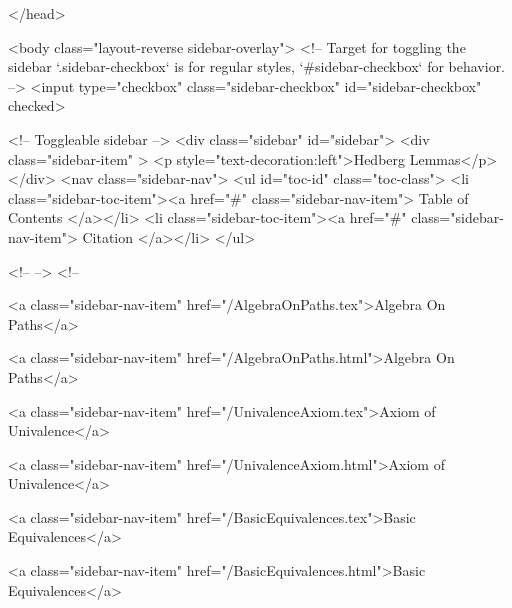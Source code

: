  
</head>




  <body class="layout-reverse sidebar-overlay">
    <!-- Target for toggling the sidebar `.sidebar-checkbox` is for regular
     styles, `#sidebar-checkbox` for behavior. -->
<input type="checkbox" class="sidebar-checkbox" id="sidebar-checkbox" checked>

<!-- Toggleable sidebar -->
<div class="sidebar" id="sidebar">
  <div class="sidebar-item" >
    <p style="text-decoration:left">Hedberg Lemmas</p>
  </div>
  <nav class="sidebar-nav">
    <ul id="toc-id" class="toc-class">
  <li class="sidebar-toc-item"><a href="#" class="sidebar-nav-item"> Table of Contents </a></li>
  <li class="sidebar-toc-item"><a href="#" class="sidebar-nav-item"> Citation </a></li>
</ul>


    <!--  -->
    <!-- 
      
    
      
    
      
    
      
    
      
        
      
    
      
        
          <a class="sidebar-nav-item" href="/AlgebraOnPaths.tex">Algebra On Paths</a>
        
      
    
      
        
          <a class="sidebar-nav-item" href="/AlgebraOnPaths.html">Algebra On Paths</a>
        
      
    
      
        
          <a class="sidebar-nav-item" href="/UnivalenceAxiom.tex">Axiom of Univalence</a>
        
      
    
      
        
          <a class="sidebar-nav-item" href="/UnivalenceAxiom.html">Axiom of Univalence</a>
        
      
    
      
        
          <a class="sidebar-nav-item" href="/BasicEquivalences.tex">Basic Equivalences</a>
        
      
    
      
        
          <a class="sidebar-nav-item" href="/BasicEquivalences.html">Basic Equivalences</a>
        
